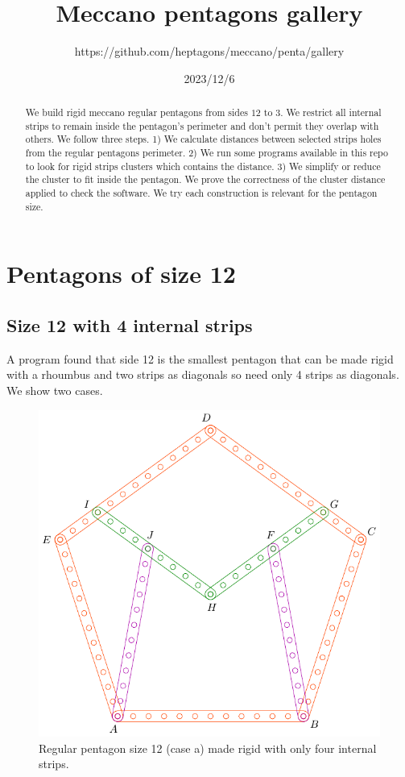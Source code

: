 \documentclass[11pt]{article}
\title{Meccano pentagons gallery}
\author{https://github.com/heptagons/meccano/penta/gallery}
\date{2023/12/6}
\begin{document}
\maketitle
\begin{abstract}
We build rigid meccano regular pentagons from sides $12$ to $3$. We restrict all internal strips to remain inside the pentagon's perimeter and don't permit they overlap with others. We follow three steps. 1) We calculate distances between selected strips holes from the regular pentagons perimeter. 2) We run some programs available in this repo to look for rigid strips clusters which contains the distance. 3) We simplify or reduce the cluster to fit inside the pentagon. We prove the correctness of the cluster distance applied to check the software. We try each construction is relevant for the pentagon size.
\end{abstract}

\section{Pentagons of size 12}

\subsection{Size 12 with 4 internal strips}

A program found that side 12 is the smallest pentagon that can be made rigid with a rhoumbus and two strips as diagonals so need only 4 strips as diagonals. We show two cases.

\begin{figure}[h]
 \centering
 \includegraphics[scale=0.8]{12/penta12a}
 \caption{Regular pentagon size 12 (case a) made rigid with only four internal strips.}
 \label{fig:penta12a}
\end{figure}
\end{document}
